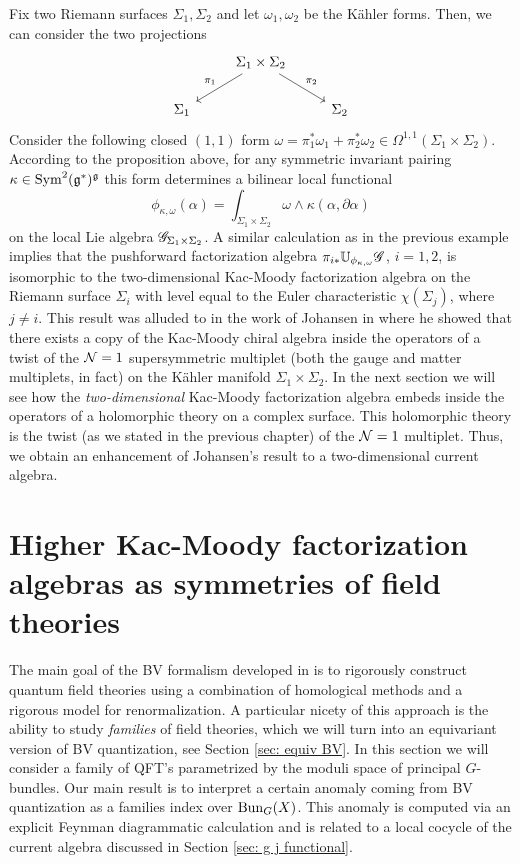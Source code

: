 \documentclass[10pt]{amsart}
\def\brian{\textcolor{blue}{BW: }\textcolor{blue}}
\begin{document}
\begin{eg}
Fix two Riemann surfaces $\Sigma_1,\Sigma_2$ and let $\omega_1,\omega_2$ be the K\"{a}hler forms. 
Then, we can consider the two projections
\[
\begin{tikzcd}
& \Sigma_1 \times \Sigma_2 \arrow[dl,"\pi_1"'] \arrow[dr,"\pi_2"] & \\
\Sigma_1 & & \Sigma_2
\end{tikzcd}
\]
Consider the following closed $(1,1)$ form $\omega = \pi_1^* \omega_1 + \pi_2^* \omega_2 \in \Omega^{1,1}(\Sigma_1 \times \Sigma_2)$. 
According to the proposition above, for any symmetric invariant pairing $\kappa \in {\rm Sym}^2 (\mathfrak g^*)^\mathfrak g$ this form determines a bilinear local functional
\[
\phi_{\kappa,\omega}(\alpha) = \int_{\Sigma_1 \times \Sigma_2} \omega \wedge \kappa(\alpha, \partial \alpha) 
\]
on the local Lie algebra $\mathscr G_{\Sigma_1\times \Sigma_2}$.
A similar calculation as in the previous example implies that the pushforward factorization algebra $\pi_{i*}\mathbb U_{\phi_{\kappa, \omega}}\mathscr G$, $i=1,2$, is isomorphic to the two-dimensional Kac-Moody factorization algebra on the Riemann surface $\Sigma_i$ with level equal to the Euler characteristic $\chi(\Sigma_j)$, where $j \ne i$. 
This result was alluded to in the work of Johansen in \cite{JohansenKM} where he showed that there exists a copy of the Kac-Moody chiral algebra inside the operators of a twist of the $\mathcal N=1$ supersymmetric multiplet (both the gauge and matter multiplets, in fact) on the K\"{a}hler manifold $\Sigma_1 \times \Sigma_2$. 
In the next section we will see how the {\em two-dimensional} Kac-Moody factorization algebra embeds inside the operators of a holomorphic theory on a complex surface. 
This holomorphic theory is the twist (as we stated in the previous chapter) of the $\mathcal N=1$ multiplet.
Thus, we obtain an enhancement of Johansen's result to a two-dimensional current algebra.
\end{eg}



\section{Higher Kac-Moody factorization algebras as symmetries of field theories}

The main goal of the BV formalism developed in \cite{CostelloRenormalization} is to rigorously construct quantum field theories using a combination of homological methods and a rigorous model for renormalization. 
A particular nicety of this approach is the ability to study {\em families} of field theories, which we will turn into an equivariant version of BV quantization, see Section \ref{sec: equiv BV}. 
In this section we will consider a family of QFT's parametrized by the moduli space of principal $G$-bundles. 
Our main result is to interpret a certain anomaly coming from BV quantization as a families index over ${\rm Bun}_G(X)$. 
This anomaly is computed via an explicit Feynman diagrammatic calculation and is related to a local cocycle of the current algebra discussed in Section \ref{sec: g j functional}.
 
\end{document}
